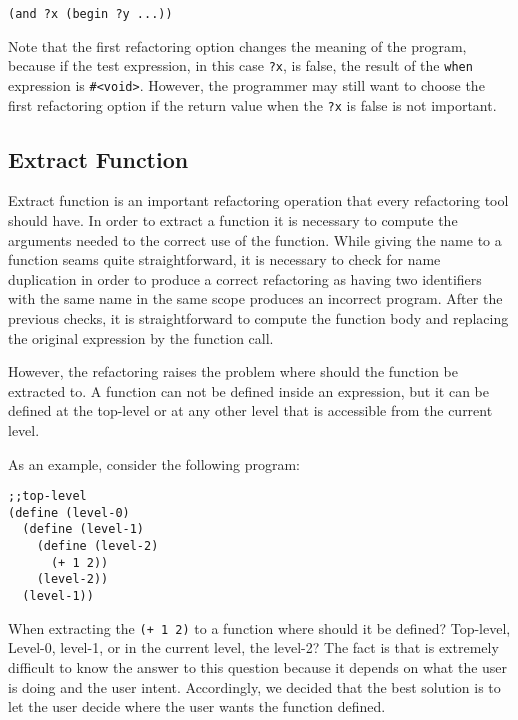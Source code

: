 \begin{lstlisting}[basicstyle=\ttfamily, caption=Refactoring option 2]
(and ?x (begin ?y ...))
\end{lstlisting}

Note that the first refactoring option changes the meaning of the
program, because if the test expression, in this case {\tt ?x}, is
false, the result of the {\tt when} expression is {\tt \#<void>}.
However, the programmer may still want to choose the first refactoring
option if the return value when the {\tt ?x} is false is not
important.%

\subsection{Extract Function}
Extract function is an important refactoring operation that every
refactoring tool should have.  In order to extract a function it is
necessary to compute the arguments needed to the correct use of the
function.  While giving the name to a function seams quite
straightforward, it is necessary to check for name duplication in
order to produce a correct refactoring as having two identifiers with
the same name in the same scope produces an incorrect program.  After
the previous checks, it is straightforward to compute the function
body and replacing the original expression by the function call.

However, the refactoring raises the problem where should the function
be extracted to. A function can not be defined inside an expression,
but it can be defined at the top-level or at any other level that is
accessible from the current level.

As an example, consider the following program:
\begin{lstlisting}[basicstyle=\ttfamily, caption=Extract function levels]
;;top-level
(define (level-0)
  (define (level-1)
    (define (level-2)
      (+ 1 2))
    (level-2))
  (level-1))
\end{lstlisting}

When extracting the {\tt (+ 1 2)} to a function where should it be
defined?  Top-level, Level-0, level-1, or in the current level, the
level-2?  The fact is that is extremely difficult to know the answer
to this question because it depends on what the user is doing and the
user intent.  Accordingly, we decided that the best solution is to let
the user decide where the user wants the function defined.


